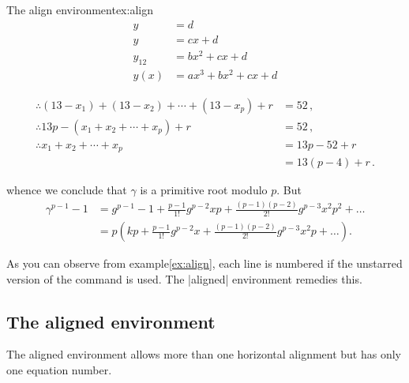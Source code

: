 \begin{texexample}{The align environment}{ex:align}
\begin{align}
         y & =d\label{eq:IntoSection}\\
         y & =cx+d\\
 y_{12} & =bx^{2}+cx+d\\
     y(x) & =ax^{3}+bx^{2}+cx+d
 \end{align}

\begin{align*}
\therefore (13 - x_1) + (13 - x_2) + \dotsb + (13 - x_p) + r &= 52\,,\\
\therefore 13p - (x_1 + x_2 + \dotsb + x_p) + r              &= 52\,,\\
\therefore x_1 + x_2 + \dotsb + x_p                          &= 13p - 52 + r\\
                                                          &= 13 (p - 4) + r\,.
\end{align*}

whence we conclude that $\gamma$ is a primitive root modulo $p$. But
\begin{align*}
\gamma^{p-1}-1 &=
     g^{p-1} - 1 + \frac{p-1}{1!}g^{p-2}xp +
        \frac{(p-1)(p-2)}{2!}g^{p-3}x^2p^2 + \ldots \\
  &= p\left(kp + \frac{p-1}{1!}g^{p-2}x +
        \frac{(p-1)(p-2)}{2!}g^{p-3}x^2p + \ldots\right).
\end{align*}
\end{texexample}

As you can observe from example\ref{ex:align}, each line is numbered if the unstarred version of the command is used. The |aligned| environment remedies this.
 


\subsection{The aligned environment}

The aligned environment allows more than one horizontal alignment but has only one equation number.

\newcommand{\dotsbsmall}{\ldot\!\ldot\!\ldot}
\newcommand{\ldot}{\mathbin{.}}			%
\newcommand{\nobf}[1]{\no \textbf{#1}}		%

